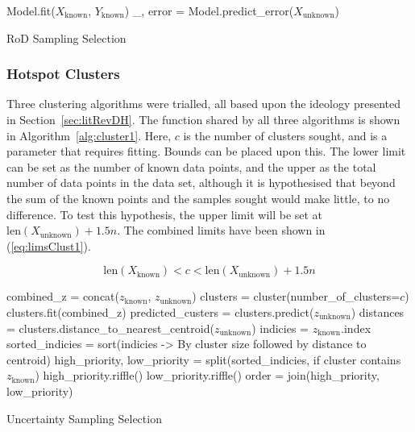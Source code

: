 \begin{algorithm}[H]
    Model.fit($X_\mathrm{known}$, $Y_\mathrm{known}$)\;
    \_, error = Model.predict\_error($X_\mathrm{unknown}$)\;
    \caption{RoD Sampling Selection}
    \label{alg:rod}\SetAlgoLined
\end{algorithm}

\subsubsection{Hotspot Clusters}
Three clustering algorithms were trialled, all based upon the ideology presented in Section~\ref{sec:litRevDH}. The function shared by all three algorithms is shown in Algorithm~\ref{alg:cluster1}. Here, $c$ is the number of clusters sought, and is a parameter that requires fitting. Bounds can be placed upon this. The lower limit can be set as the number of known data points, and the upper as the total number of data points in the data set, although it is hypothesised that beyond the sum of the known points and the samples sought would make little, to no difference. To test this hypothesis, the upper limit will be set at $\mathrm{len}(X_\mathrm{unknown})+1.5n$. The combined limits have been shown in (\ref{eq:limsClust1}).

\begin{equation}
    \label{eq:limsClust1}
    {\mathrm{len}(X_\mathrm{known})<c<\mathrm{len}(X_\mathrm{unknown})+1.5n}
\end{equation}

\begin{algorithm}[H]
    combined\_z = concat($z_\mathrm{known}$, $z_\mathrm{unknown}$)\;
    clusters = cluster(number\_of\_clusters=$c$)\;
    clusters.fit(combined\_z)\;
    predicted\_custers = clusters.predict($z_\mathrm{unknown}$)\;
    distances = clusters.distance\_to\_nearest\_centroid($z_\mathrm{unknown}$)\;
    indicies = $z_\mathrm{known}$.index\;
    sorted\_indicies = sort(indicies -> By cluster size followed by distance to centroid) \;
    high\_priority, low\_priority = split(sorted\_indicies, if cluster contains $z_\mathrm{known}$)\;
    high\_priority.riffle()\;
    low\_priority.riffle()\;
    order = join(high\_priority, low\_priority)\;

    \caption{Uncertainty Sampling Selection}
    \label{alg:cluster1}\SetAlgoLined
\end{algorithm}

